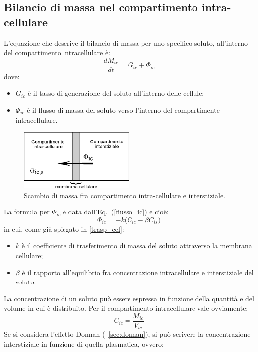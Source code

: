 \subsection{Bilancio di massa nel compartimento intra-cellulare}
L'equazione che descrive il bilancio di massa per uno specifico soluto, all'interno del compartimento intracellulare è:
\begin{equation}
	\frac{dM_{ic}}{dt} = G_{ic}+ \Phi_{ic}
	\label{eq:dMic}
\end{equation}
dove:
\begin{itemize}
	\item $G_{ic}$ è il tasso di generazione del soluto all'interno delle cellule;
	\item $\Phi_{ic}$ è il flusso di massa del soluto verso l'interno del compartimente intracellulare.
\end{itemize}
\begin{figure}[htb]
	\centering
		\includegraphics[width=0.5\textwidth]{immagini/massa_ic.eps}
				\caption{Scambio di massa fra compartimento intra-cellulare e interstiziale.}
\end{figure}
La formula per $\Phi_{ic}$ è data dall'Eq.~(\ref{flusso_ic}) e cioè:
\begin{equation}
	\Phi_{ic} = - k \bigl(C_{ic} - \beta C_{is}\bigr)
	\label{eq:phi_ic}
\end{equation}
in cui, come già spiegato in \textsection\ref{trasp_cel}:
\begin{itemize}
	\item $k$ è il coefficiente di trasferimento di massa del soluto attraverso la membrana cellulare;
	\item $\beta$ è il rapporto all'equilibrio fra concentrazione intracellulare e interstiziale del soluto.
\end{itemize}
La concentrazione di un soluto può essere espressa in funzione della quantità e del volume in cui è distribuito. Per il compartimento intracellulare vale ovviamente:
\begin{equation}\label{eq:ovvia}
	C_{ic} = \frac{M_{ic}}{V_{ic}}
\end{equation}
Se si considera l'effetto Donnan (\textsection~\ref{sec:donnan}), si può scrivere la concentrazione interstiziale in funzione di quella plasmatica, ovvero:
